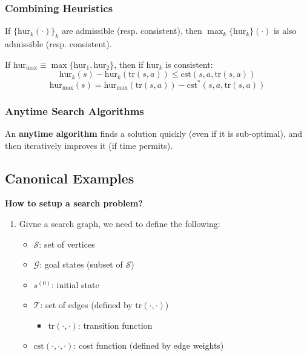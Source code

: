 \subsubsection{Combining Heuristics}
\begin{definition}
    If $\{ \text{hur}_k(\cdot) \}_k$ are admissible (resp. consistent), then $\max_k \{\text{hur}_k\} (\cdot)$ is also admissible (resp. consistent).
\end{definition}

\begin{definition}
    If $\text{hur}_{\max} \equiv \max \{\text{hur}_1, \text{hur}_2\}$, then if $\text{hur}_k$ is consistent:
    \[
    \text{hur}_k(s) - \text{hur}_k(\text{tr}(s,a)) \leq \text{cst}(s,a,\text{tr}(s,a))
    \]
    \[
    \text{hur}_{\max} (s)= \text{hur}_{\max}(\text{tr}(s,a)) - \text{cst}^*(s,a,\text{tr}(s,a))
    \]
\end{definition}

\subsubsection{Anytime Search Algorithms}
\begin{definition}
    An \textbf{anytime algorithm} finds a solution quickly (even if it is sub-optimal), and then iteratively improves it (if time permits).
\end{definition}
\newpage

\subsection{Canonical Examples}
\begin{process} \textbf{How to setup a search problem?}
    \begin{enumerate}
        \item Givne a search graph, we need to define the following:
        \begin{itemize}
            \item $\mathcal{S}$: set of vertices
            \item $\mathcal{G}$: goal states (subset of $\mathcal{S}$)
            \item $s^{(0)}$: initial state
            \item $\mathcal{T}$: set of edges (defined by $\text{tr}(\cdot, \cdot)$)
            \begin{itemize}
                \item $\text{tr}(\cdot, \cdot)$: transition function
            \end{itemize}
            \item $\text{cst}(\cdot, \cdot, \cdot)$: cost function (defined by edge weights)
        \end{itemize}
    \end{enumerate}
\end{process}

